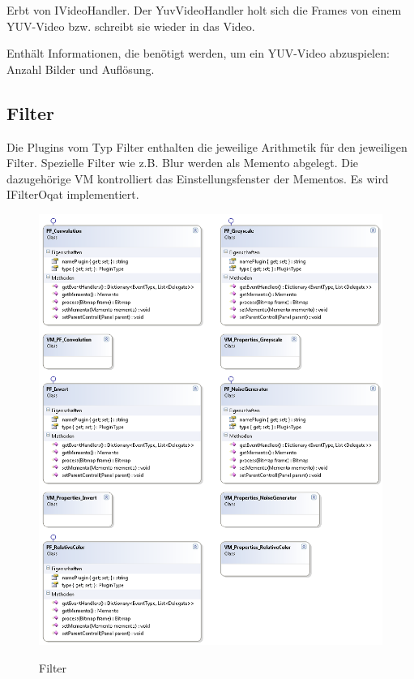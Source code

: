 Erbt von IVideoHandler. Der YuvVideoHandler holt sich die Frames von einem YUV-Video bzw. schreibt sie wieder in das Video.


Enthält Informationen, die benötigt werden, um ein YUV-Video abzuspielen: Anzahl Bilder und Auflösung.



\pagebreak
\subsection{Filter}
Die Plugins vom Typ Filter enthalten die jeweilige Arithmetik für den jeweiligen Filter. Spezielle Filter wie z.B. Blur werden als Memento abgelegt. Die dazugehörige VM kontrolliert das Einstellungsfenster der Mementos. Es wird IFilterOqat  implementiert.
\begin{figure}[h]
\noindent\includegraphics[width=\linewidth,height=\textheight,
keepaspectratio]{bilder/Klassendiagramm/Plugins3.png}
\label{}
\caption{Filter}
\end{figure}


